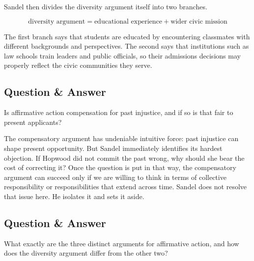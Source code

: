 Sandel then divides the diversity argument itself into two branches.

\begin{equation}
\text{diversity argument}
=
\text{educational experience} + \text{wider civic mission}
\end{equation}

\begin{figure}[h]
\centering
{}
\end{figure}

The first branch says that students are educated by encountering classmates with different backgrounds and perspectives. The second says that institutions such as law schools train leaders and public officials, so their admissions decisions may properly reflect the civic communities they serve.

\subsection{Question \& Answer}

Is affirmative action compensation for past injustice, and if so is that fair to present applicants?

The compensatory argument has undeniable intuitive force: past injustice can shape present opportunity. But Sandel immediately identifies its hardest objection. If Hopwood did not commit the past wrong, why should she bear the cost of correcting it? Once the question is put in that way, the compensatory argument can succeed only if we are willing to think in terms of collective responsibility or responsibilities that extend across time. Sandel does not resolve that issue here. He isolates it and sets it aside.

\subsection{Question \& Answer}

What exactly are the three distinct arguments for affirmative action, and how does the diversity argument differ from the other two?

